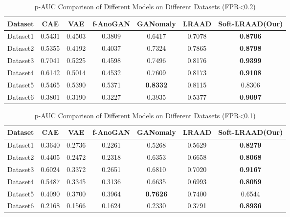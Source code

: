 \documentclass{article}
\begin{document}
\begin{table}[H]
    \centering
    \caption{p-AUC Comparison of Different Models on Different Datasets (FPR<0.2)}
    \begin{tabular}{ccccccc}
        \toprule
        Dataset & CAE & VAE & f-AnoGAN & GANomaly & LRAAD & Soft-LRAAD(Our) \\
        \midrule
        Dataset1 & 0.5431 & 0.4503 & 0.3809 & 0.6417 & 0.7078 & \textbf{0.8706} \\
        Dataset2 & 0.5355 & 0.4192 & 0.4037 & 0.7324 & 0.7865 & \textbf{0.8798} \\
        Dataset3 & 0.7041 & 0.5225 & 0.4598 & 0.7496 & 0.8176 & \textbf{0.9399} \\
        Dataset4 & 0.6142 & 0.5014 & 0.4532 & 0.7609 & 0.8173 & \textbf{0.9108} \\
        Dataset5 & 0.5465 & 0.5390 & 0.5371 & \textbf{0.8332} & 0.8115 & 0.8306 \\
        Dataset6 & 0.3801 & 0.3190 & 0.3227 & 0.3935 & 0.5377 & \textbf{0.9097} \\
        \bottomrule
    \end{tabular}
    \label{tab:p-auc-02}
\end{table}

\begin{table}[H]
    \centering
    \caption{p-AUC Comparison of Different Models on Different Datasets (FPR<0.1)}
    \begin{tabular}{ccccccc}
        \toprule
        Dataset & CAE & VAE & f-AnoGAN & GANomaly & LRAAD & Soft-LRAAD(Our) \\
        \midrule
        Dataset1 & 0.3640 & 0.2736 & 0.2261 & 0.5268 & 0.5629 & \textbf{0.8279} \\
        Dataset2 & 0.4405 & 0.2472 & 0.2318 & 0.6353 & 0.6658 & \textbf{0.8068} \\
        Dataset3 & 0.6024 & 0.3372 & 0.2651 & 0.6810 & 0.7020 & \textbf{0.9167} \\
        Dataset4 & 0.5487 & 0.3345 & 0.3136 & 0.6635 & 0.6993 & \textbf{0.8059} \\
        Dataset5 & 0.4090 & 0.3700 & 0.3964 & \textbf{0.7626} & 0.7400 & 0.6544 \\
        Dataset6 & 0.2168 & 0.1566 & 0.1624 & 0.2330 & 0.3791 & \textbf{0.8936} \\
        \bottomrule
    \end{tabular}
    \label{tab:p-auc-01}
\end{table}
\end{document}

